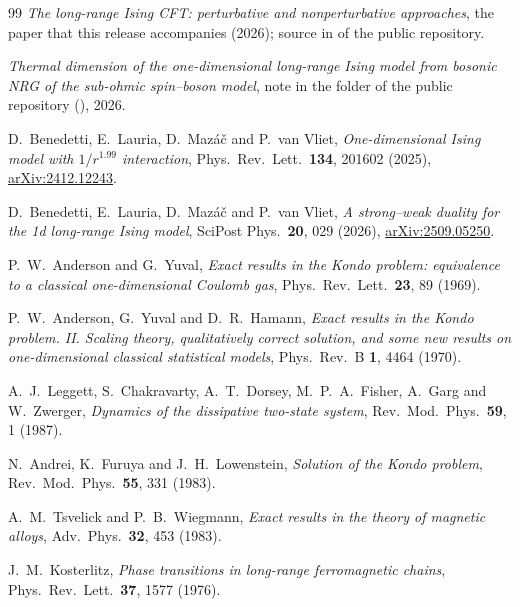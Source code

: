 {}
\begin{thebibliography}{99}
\emph{The long-range Ising CFT: perturbative and nonperturbative approaches}, the paper that this
release accompanies (2026); source in  of the public repository.

\emph{Thermal dimension of the one-dimensional long-range Ising model from bosonic NRG of the sub-ohmic spin--boson
model}, note in the folder  of the public repository (), 2026.

D.~Benedetti, E.~Lauria, D.~Maz\'a\v c and P.~van Vliet,
\emph{One-dimensional Ising model with $1/r^{1.99}$ interaction},
Phys.\ Rev.\ Lett.\ \textbf{134}, 201602 (2025),
\href{https://arxiv.org/abs/2412.12243}{arXiv:2412.12243}.

D.~Benedetti, E.~Lauria, D.~Maz\'a\v c and P.~van Vliet,
\emph{A strong--weak duality for the 1d long-range Ising model},
SciPost Phys.\ \textbf{20}, 029 (2026),
\href{https://arxiv.org/abs/2509.05250}{arXiv:2509.05250}.

P.~W.~Anderson and G.~Yuval,
\emph{Exact results in the Kondo problem: equivalence to a classical one-dimensional Coulomb gas},
Phys.\ Rev.\ Lett.\ \textbf{23}, 89 (1969).

P.~W.~Anderson, G.~Yuval and D.~R.~Hamann,
\emph{Exact results in the Kondo problem. II. Scaling theory, qualitatively correct solution, and some new results on
one-dimensional classical statistical models}, Phys.\ Rev.\ B \textbf{1}, 4464 (1970).

A.~J.~Leggett, S.~Chakravarty, A.~T.~Dorsey, M.~P.~A.~Fisher, A.~Garg and W.~Zwerger,
\emph{Dynamics of the dissipative two-state system},
Rev.\ Mod.\ Phys.\ \textbf{59}, 1 (1987).

N.~Andrei, K.~Furuya and J.~H.~Lowenstein,
\emph{Solution of the Kondo problem},
Rev.\ Mod.\ Phys.\ \textbf{55}, 331 (1983).

A.~M.~Tsvelick and P.~B.~Wiegmann,
\emph{Exact results in the theory of magnetic alloys},
Adv.\ Phys.\ \textbf{32}, 453 (1983).

J.~M.~Kosterlitz,
\emph{Phase transitions in long-range ferromagnetic chains},
Phys.\ Rev.\ Lett.\ \textbf{37}, 1577 (1976).


\end{thebibliography}
